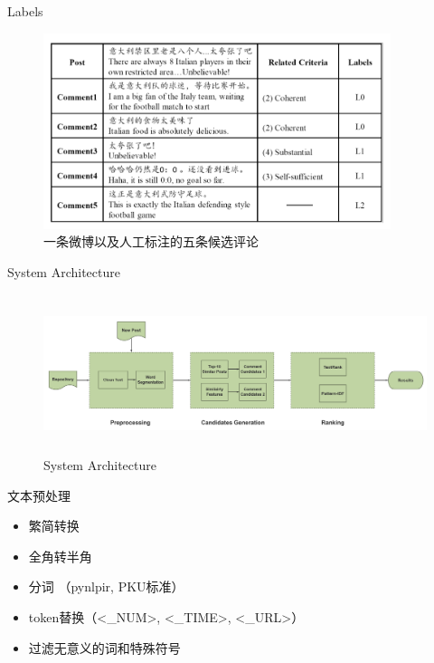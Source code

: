 \documentclass[aspectratio=169]{beamer}
\begin{document}
        \begin{frame}{Labels}
          \begin{center}
            \begin{figure}
            \includegraphics[width=4in,height=2.25in]{stc-labels.png}
            \caption{一条微博以及人工标注的五条候选评论}
            \end{figure}
          \end{center}
        \end{frame}

    \begin{frame}{System Architecture}
      \begin{figure}
      \includegraphics[width=14cm,height=4.63cm]{stc-flow-big.png}
      \caption{System Architecture}
      \end{figure}
    \end{frame}

    \begin{frame}{文本预处理}
      \begin{itemize}
        \item 繁简转换
        \item 全角转半角
        \item 分词 （pynlpir, PKU标准）
        \item token替换（<\_NUM>, <\_TIME>, <\_URL>）
        \item 过滤无意义的词和特殊符号
      \end{itemize}
    \end{frame}
\end{document}
